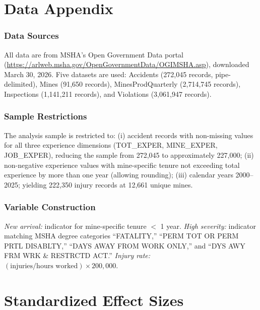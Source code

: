 \documentclass[12pt]{article}
\begin{document}
\label{apep_main_text_end}
\newpage



\newpage
\appendix

\section{Data Appendix}

\subsubsection*{Data Sources} All data are from MSHA's Open Government Data portal (\url{https://arlweb.msha.gov/OpenGovernmentData/OGIMSHA.asp}), downloaded March 30, 2026. Five datasets are used: Accidents (272,045 records, pipe-delimited), Mines (91,650 records), MinesProdQuarterly (2,714,745 records), Inspections (1,141,211 records), and Violations (3,061,947 records).

\subsubsection*{Sample Restrictions} The analysis sample is restricted to: (i) accident records with non-missing values for all three experience dimensions (TOT\_EXPER, MINE\_EXPER, JOB\_EXPER), reducing the sample from 272,045 to approximately 227,000; (ii) non-negative experience values with mine-specific tenure not exceeding total experience by more than one year (allowing rounding); (iii) calendar years 2000--2025; yielding 222,350 injury records at 12,661 unique mines.

\subsubsection*{Variable Construction} \textit{New arrival:} indicator for mine-specific tenure $<$ 1 year. \textit{High severity:} indicator matching MSHA degree categories ``FATALITY,'' ``PERM TOT OR PERM PRTL DISABLTY,'' ``DAYS AWAY FROM WORK ONLY,'' and ``DYS AWY FRM WRK \& RESTRCTD ACT.'' \textit{Injury rate:} $(\text{injuries} / \text{hours worked}) \times 200{,}000$.


\section{Standardized Effect Sizes}
\label{sec:sde}


\end{document}
